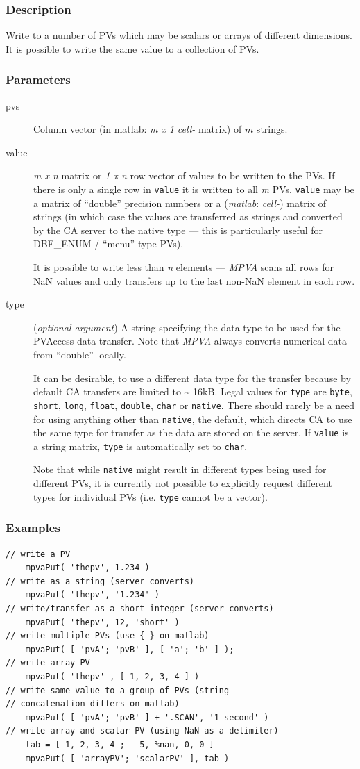 \documentclass{article}
\newcommand{\sca}{\ita{MPVA}}
\newcommand{\matlab}{\ita{matlab}}
\newcommand{\com}[1]{{\tt #1}}
\newcommand{\NAN}{\mbox{NaN}}
\newcommand{\ita}[1]{\emph{#1}}
\newcommand{\m}{$m$}
\newcommand{\mhack}{$m$} %
\newcommand{\n}{$n$}
\newcommand{\mxn}{$m\times n$}
\newcommand{\mxl}{$m\times 1$}
\newcommand{\lxn}{$1\times n$}
\newcommand{\calimit}{$\approx 16$kB}
\renewcommand{\m}{\ita{m}}
\newcommand{\mhack}{\ita{m}} %
\renewcommand{\n}{\ita{n}}
\renewcommand{\mxn}{\ita{m x n}}
\renewcommand{\mxl}{\ita{m x 1}}
\renewcommand{\lxn}{\ita{1 x n}}
\renewcommand{\calimit}{\~{} 16kB}
\newcommand{\PVITEM}{
\item[pvs] Column vector (in matlab: \mxl{} \ita{cell-} matrix)
of \mhack{} strings.
}
\begin{document}
\subsubsection{Description}
Write to a number of PVs which may be scalars or arrays of different
dimensions. It is possible to write the same value to a collection of PVs.
\subsubsection{Parameters}
\begin{description}
\PVITEM
%
%
\item[value] \mxn{} matrix or \lxn{} row vector of values
to be written to the PVs. If there is only a single row in \com{value}{}
it is written to all \m{} PVs. \com{value} may be a matrix of ``double''
precision numbers or  a (\matlab: \ita{cell-}) matrix of strings (in
which case the values are transferred as strings and converted by the
CA server to the native type --- this is particularly useful for
DBF\_ENUM / ``menu'' type PVs).

It is possible to write less than \n{} elements --- \sca{} scans all rows
for \NAN{} values and only transfers up to the last non-\NAN{} element in each
row.
%
%
\item[type] (\ita{optional argument}) A string specifying the
data type to be used for the PVAccess data transfer. Note
that \sca{} always converts numerical data from ``double'' locally.

It can be desirable, to use a different data type for the
transfer because by default CA transfers are limited to \calimit.
Legal values for \com{type}{} are \com{byte}, \com{short}, \com{long},
\com{float}, \com{double}, \com{char} or \com{native}. There should rarely
be a need for using anything other than \com{native}, the default,
which directs CA to use the same type for transfer as the data are
stored on the server. If \com{value} is a string matrix, \com{type}
is automatically set to \com{char}.

Note that while \com{native}{} might result in different types
being used for different PVs, it is currently not possible to
explicitly request different types for individual PVs (i.e. 
\com{type}{} cannot be a vector).
%
\end{description}

\subsubsection{Examples}
\begin{verbatim}
// write a PV
    mpvaPut( 'thepv', 1.234 )
// write as a string (server converts)
    mpvaPut( 'thepv', '1.234' )
// write/transfer as a short integer (server converts)
    mpvaPut( 'thepv', 12, 'short' )
// write multiple PVs (use { } on matlab)
    mpvaPut( [ 'pvA'; 'pvB' ], [ 'a'; 'b' ] );
// write array PV
    mpvaPut( 'thepv' , [ 1, 2, 3, 4 ] )
// write same value to a group of PVs (string
// concatenation differs on matlab)
    mpvaPut( [ 'pvA'; 'pvB' ] + '.SCAN', '1 second' )
// write array and scalar PV (using NaN as a delimiter)
    tab = [ 1, 2, 3, 4 ;   5, %nan, 0, 0 ]
	mpvaPut( [ 'arrayPV'; 'scalarPV' ], tab )
\end{verbatim}
\end{document}
